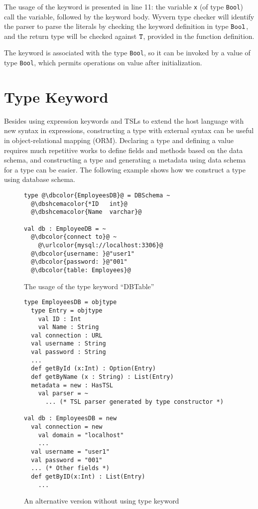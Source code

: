 \documentclass{sig-alternate}
\newcommand{\urlcolor}[1]{\textcolor[HTML]{FFCC33}{#1}}
\newcommand{\dbcolor}[1]{\textcolor[HTML]{FF47FF}{#1}}
\newcommand{\dbshcemacolor}[1]{\textcolor[HTML]{5AC3D1}{#1}}
\newcommand{\mycaption}[1]{\vspace{-4px}\caption{#1}\vspace{-2px}}
\begin{document}
The usage of the keyword is presented in line 11: the variable \verb|x| (of type \verb|Bool|) call the variable, followed by the keyword body. Wyvern type checker will identify the parser to parse the literals by checking the keyword definition in type $\verb|Bool|$, and the return type will be checked against $\verb|T|$, provided in the function definition.  

The keyword is associated with the type \verb|Bool|, so it can be invoked by a value of type \verb|Bool|, which permits operations on value after initialization. 

\section{Type Keyword}\label{tsm-type}
Besides using expression keywords and TSLs to extend the host language with new syntax in expressions, constructing a type with external syntax can be useful in object-relational mapping (ORM). Declaring a type and defining a value requires much repetitive works to define fields and methods based on the data schema, and constructing a type and generating a metadata using data schema for a type can be easier. The following example shows how we construct a type using database schema.

\begin{figure}
\begin{lstlisting}[style=wyvern]
type @\dbcolor{EmployeesDB}@ = DBSchema ~
  @\dbshcemacolor{*ID   int}@
  @\dbshcemacolor{Name  varchar}@

val db : EmployeeDB = ~
  @\dbcolor{connect to}@ ~
    @\urlcolor{mysql://localhost:3306}@
  @\dbcolor{username: }@"user1"
  @\dbcolor{password: }@"001"
  @\dbcolor{table: Employees}@
\end{lstlisting}
\mycaption{The usage of the type keyword ``DBTable''}
\label{f-tykwexample}
\end{figure}

\begin{figure}[ht]
\begin{lstlisting}[style=wyvern]
type EmployeesDB = objtype
  type Entry = objtype
    val ID : Int
    val Name : String 
  val connection : URL
  val username : String
  val password : String
  ...
  def getById (x:Int) : Option(Entry)
  def getByName (x : String) : List(Entry)
  metadata = new : HasTSL
    val parser = ~
      ... (* TSL parser generated by type constructor *)

val db : EmployeesDB = new
  val connection = new
    val domain = "localhost"
    ...
  val username = "user1"
  val password = "001"
  ... (* Other fields *)
  def getByID(x:Int) : List(Entry)
    ...
\end{lstlisting}
\mycaption{An alternative version without using type keyword}
\label{typekw-example-2}
\end{figure}
\end{document}
